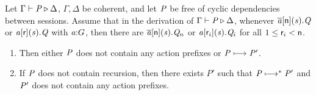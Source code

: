 \begin{theorem}
	\label{thm:progress}
	Let $ \Gamma \vdash \PT \triangleright \Delta $, $ \Gamma, \Delta $ be coherent, and let $ \PT $ be free of cyclic dependencies between sessions.
	Assume that in the derivation of $ \Gamma \vdash \PT \triangleright \Delta $, whenever $ \PReq{\Chan[a]}{\Role[n]}{\Chan}{\PT[Q]} $ or $ \PAcc{\Chan[a]}{\Role}{\Chan}{\PT[Q]} $ with $ \Typed{\Chan[a]}{\GT} $, then there are $ \PReq{\Chan[a]}{\Role[n]}{\Chan}{\PT[Q]_n} $ or $ \PAcc{\Chan[a]}{\Role_i}{\Chan}{\PT[Q]_i} $ for all $ 1 \leq \Role_i < \Role[n] $.
	\begin{enumerate}
		\item Then either $ \PT $ does not contain any action prefixes or $ \PT \step \PT' $.
		\item If $ \PT $ does not contain recursion, then there exists $ P' $ such that $ \PT \steps \PT' $ and $ \PT' $ does not contain any action prefixes.
	\end{enumerate}
\end{theorem}

